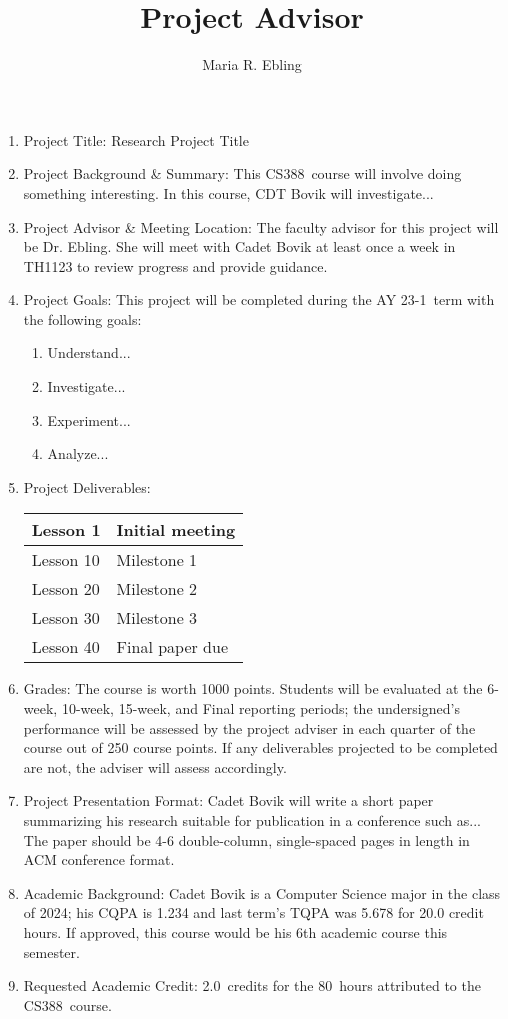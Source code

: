 \documentclass{armymemo}
\author{Maria R. Ebling}
\title{Project Advisor}
\newcommand{\CourseNum}{CS388}
\newcommand{\Credits}{2.0} %
\newcommand{\Hours}{80}    %
\newcommand{\Term}{23-1}
\begin{document}
\begin{enumerate}
\item Project Title: Research Project Title
\item Project Background \& Summary: This \CourseNum\ course will involve doing something interesting. In this course, CDT Bovik will investigate...
\item Project Advisor \& Meeting Location: The faculty advisor for this project will be Dr. Ebling. She will meet with Cadet Bovik at least once a week in TH1123 to review progress and provide guidance.
\item Project Goals: This project will be completed during the AY \Term\ term with the following goals:
\begin{enumerate}
    \item Understand...
    \item Investigate...
    \item Experiment...
    \item Analyze...
\end{enumerate}
\item Project Deliverables:
\begin{center}
\begin{tabular}{|l|l|}
\hline
     Lesson 1 & Initial meeting \\ \hline
     Lesson 10 & Milestone 1 \\ \hline
     Lesson 20 & Milestone 2 \\ \hline
     Lesson 30 & Milestone 3 \\ \hline
     Lesson 40 & Final paper due \\ \hline
\end{tabular}
\end{center}
\item Grades: The course is worth 1000 points. Students will be evaluated at the 6-week, 10-week, 15-week, and Final reporting periods; the undersigned’s performance will be assessed by the project adviser in each quarter of the course out of 250 course points.  If any deliverables projected to be completed are not, the adviser will assess accordingly.
\item Project Presentation Format: Cadet Bovik will write a short paper summarizing his research suitable for publication in a conference such as... The paper should be 4-6 double-column, single-spaced pages in length in ACM conference format.
\item Academic Background: Cadet Bovik is a Computer Science major in the class of 2024; his CQPA is 1.234 and last term's TQPA was 5.678 for 20.0 credit hours. If approved, this course would be his 6th academic course this semester.
\item Requested Academic Credit: \Credits\ credits for the \Hours\ hours attributed to the \CourseNum\ course.
\end{enumerate}
\end{document}

